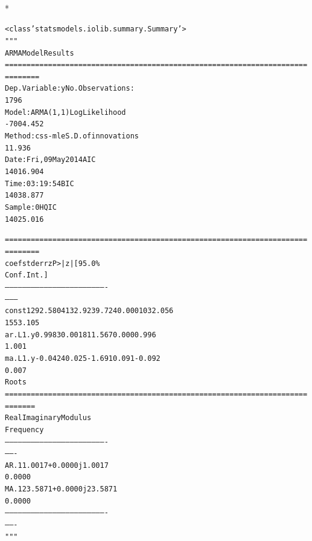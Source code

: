 \documentclass[letterpaper,10pt,english]{/Users/edwsurewin/anaconda/lib/python2.7/site-packages/sphinx/texinputs/sphinxhowto}
\def\smaller{\fontsize{9.5pt}{9.5pt}\selectfont}
\newenvironment{InvisibleVerbatim}
        {\begin{mdframed}[leftmargin=0.1\linewidth,innerleftmargin=3pt,innerrightmargin=3pt, userdefinedwidth=1\linewidth, linewidth=0pt, linecolor=white, usetwoside=false]}
        {\end{mdframed}}
\begin{document}
    

        
        

            
                \makebox[0.1\linewidth]{\smaller\hfill\tt\color{nbframe-out-prompt}Out\hspace{4pt}{[}62{]}:\hspace{4pt}}\\*
                \vspace{-2.55\baselineskip}\begin{InvisibleVerbatim}
                \vspace{-0.5\baselineskip}
\begin{alltt}<class 'statsmodels.iolib.summary.Summary'>
"""
                              ARMA Model Results
======================================================================
========
Dep. Variable:                      y   No. Observations:
1796
Model:                     ARMA(1, 1)   Log Likelihood
-7004.452
Method:                       css-mle   S.D. of innovations
11.936
Date:                Fri, 09 May 2014   AIC
14016.904
Time:                        03:19:54   BIC
14038.877
Sample:                             0   HQIC
14025.016

======================================================================
========
                 coef    std err          z      P>|z|      [95.0\%
Conf. Int.]
----------------------------------------------------------------------
--------
const       1292.5804    132.923      9.724      0.000      1032.056
1553.105
ar.L1.y        0.9983      0.001    811.567      0.000         0.996
1.001
ma.L1.y       -0.0424      0.025     -1.691      0.091        -0.092
0.007
                                    Roots
======================================================================
=======
                 Real           Imaginary           Modulus
Frequency
----------------------------------------------------------------------
-------
AR.1            1.0017           +0.0000j            1.0017
0.0000
MA.1           23.5871           +0.0000j           23.5871
0.0000
----------------------------------------------------------------------
-------
"""\end{alltt}

            \end{InvisibleVerbatim}
            
\end{document}
